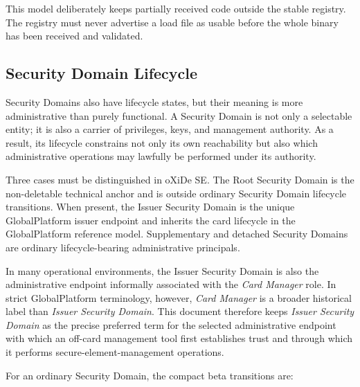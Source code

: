 This model deliberately keeps partially received code outside the stable
registry. The registry must never advertise a load file as usable before the
whole binary has been received and validated.

\subsection{Security Domain Lifecycle}
\label{sec:gp-lifecycle-domain}


Security Domains also have lifecycle states, but their meaning is more
administrative than purely functional. A Security Domain is not only a
selectable entity; it is also a carrier of privileges, keys, and
management authority. As a result, its lifecycle constrains not only its
own reachability but also which administrative operations may lawfully be
performed under its authority.

Three cases must be distinguished in oXiDe SE. The Root Security Domain is the
non-deletable technical anchor and is outside ordinary Security Domain
lifecycle transitions. When present, the Issuer Security Domain is the unique
GlobalPlatform issuer endpoint and inherits the card lifecycle in the
GlobalPlatform reference model. Supplementary and detached Security Domains
are ordinary lifecycle-bearing administrative principals.

In many operational environments, the Issuer Security Domain is also the
administrative endpoint informally associated with the \emph{Card Manager}
role. In strict GlobalPlatform terminology, however, \emph{Card Manager} is a
broader historical label than \emph{Issuer Security Domain}. This document
therefore keeps \emph{Issuer Security Domain} as the precise preferred term for
the selected administrative endpoint with which an off-card management tool
first establishes trust and through which it performs secure-element-management
operations.

For an ordinary Security Domain, the compact beta transitions are:


